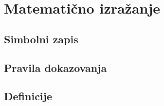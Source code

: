 \chapter{Matematično izražanje}

	\section{Simbolni zapis}
	\section{Pravila dokazovanja}
	\section{Definicije}